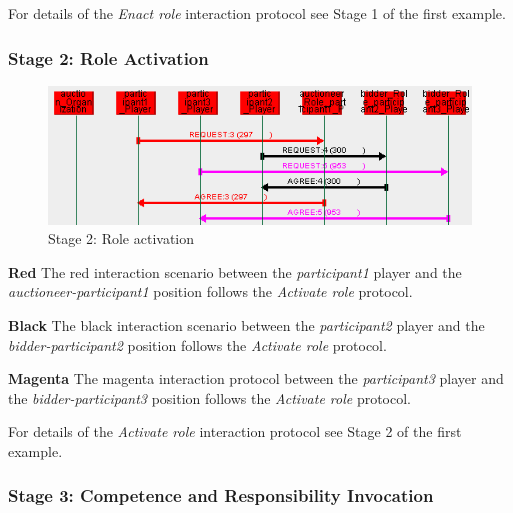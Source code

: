 For details of the \textit{Enact role} interaction protocol see Stage 1 of the first example.

\subsubsection*{Stage 2: Role Activation}

\begin{figure}[H]
	\centering
	\includegraphics[width=\textwidth]{images/example3-stage2.png}
	\caption{Stage 2: Role activation}
	\label{figure:example3-stage2}
\end{figure}

\textbf{Red} The red interaction scenario between the \textit{participant1} player and the \textit{auctioneer-participant1} position follows the \textit{Activate role} protocol.

\textbf{Black} The black interaction scenario between the \textit{participant2} player and the \textit{bidder-participant2} position follows the \textit{Activate role} protocol.

\textbf{Magenta} The magenta interaction protocol between the \textit{participant3} player and the \textit{bidder-participant3} position follows the \textit{Activate role} protocol.

For details of the \textit{Activate role} interaction protocol see Stage 2 of the first example.

\subsubsection*{Stage 3: Competence and Responsibility Invocation}

